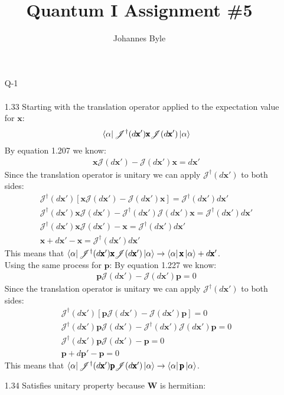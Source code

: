 \documentclass[12pt]{article}
\title{Quantum I Assignment \#5}
\author{Johannes Byle}
\newcommand{\op}[1]{\tilde{\mathbf{#1}}}
\newcommand{\opx}{\pmb{\text{x}}}
\newcommand{\jac}{\mathscr{J}(d\opx')}
\newcommand{\jacdag}{\mathscr{J}^{\dag}(d\opx')}
\newcommand{\opp}{\pmb{\text{p}}}
\newcommand{\opw}{\pmb{\text{W}}}
\begin{document}
  \maketitle
  \begin{enumerate}
    \item[Q-1]
    \begin{align*}
    [\op{X},\op{H}]
    \end{align*}
    \item[1.33] Starting with the translation operator applied to the expectation value for $\opx$:
    \begin{gather*}
      \bra{\alpha}\jacdag\opx\jac\ket{\alpha}\\
    \end{gather*}
    By equation 1.207 we know:
    \begin{gather*}
      \opx\jac-\jac\opx=d\opx'
    \end{gather*}
    Since the translation operator is unitary we can apply $\jacdag$ to both sides:
    \begin{gather*}
      \jacdag\left[\opx\jac-\jac\opx\right]=\jacdag d\opx'\\
      \jacdag \opx\jac-\jacdag\jac\opx=\jacdag d\opx'\\
      \jacdag \opx\jac-\opx=\jacdag d\opx'\\
      \opx+d\opx'-\opx=\jacdag d\opx'
    \end{gather*}
    This means that $\bra{\alpha}\jacdag\opx\jac\ket{\alpha}\rightarrow\bra{\alpha}\opx\ket{\alpha}+d\opx'$.\\
    Using the same process for $\opp$:
    By equation 1.227 we know:
    \begin{gather*}
      \opp\jac-\jac\opp=0
    \end{gather*}
    Since the translation operator is unitary we can apply $\jacdag$ to both sides:
    \begin{gather*}
      \jacdag\left[\opp\jac-\jac\opp\right]=0\\
      \jacdag \opp\jac-\jacdag\jac\opp=0\\
      \jacdag \opp\jac-\opp=0\\
      \opp+d\opp'-\opp=0
    \end{gather*}
    This means that $\bra{\alpha}\jacdag\opp\jac\ket{\alpha}\rightarrow\bra{\alpha}\opp\ket{\alpha}$.\\
    \item[1.34] Satisfies unitary property because $\opw$ is hermitian:
    \begin{align*}

\end{align*}
\end{enumerate}
\end{document}
